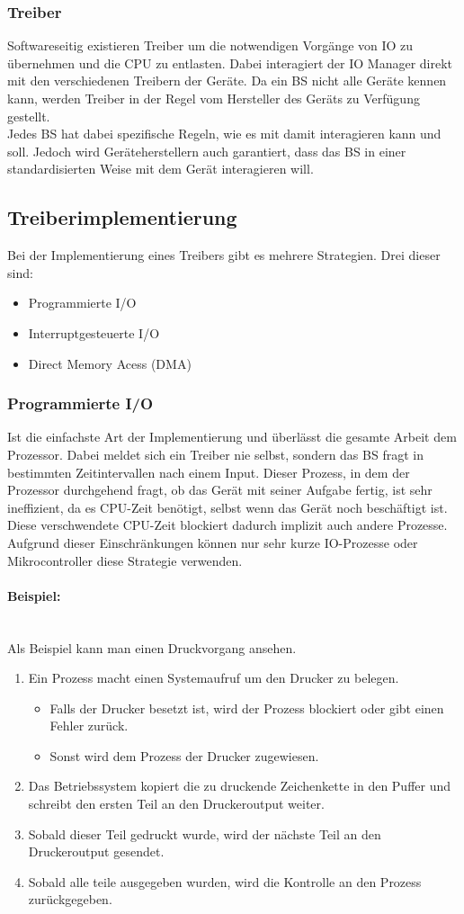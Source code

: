 \documentclass{article}
\newcommand{\paragraphlb}[1]{\paragraph{#1}\mbox{}\\}
\begin{document}
	\subsubsection{Treiber}
	Softwareseitig existieren Treiber um die notwendigen Vorgänge von IO zu übernehmen und die CPU zu entlasten. Dabei interagiert der IO Manager direkt mit den verschiedenen Treibern der Geräte. Da ein BS nicht alle Geräte kennen kann, werden Treiber in der Regel vom Hersteller des Geräts zu Verfügung gestellt. \\
	Jedes BS hat dabei spezifische Regeln, wie es mit damit interagieren kann und soll. Jedoch wird Geräteherstellern auch garantiert, dass das BS in einer standardisierten Weise mit dem Gerät interagieren will.
	\subsection{Treiberimplementierung}
	Bei der Implementierung eines Treibers gibt es mehrere Strategien. Drei dieser sind:
	\begin{itemize}
		\item{Programmierte I/O}
		\item{Interruptgesteuerte I/O}
		\item{Direct Memory Acess (DMA)}
	\end{itemize}
	\subsubsection{Programmierte I/O}
	Ist die einfachste Art der Implementierung und überlässt die gesamte Arbeit dem Prozessor. Dabei meldet sich ein Treiber nie selbst, sondern das BS fragt in bestimmten Zeitintervallen nach einem Input. Dieser Prozess, in dem der Prozessor durchgehend fragt, ob das Gerät mit seiner Aufgabe fertig, ist sehr ineffizient, da es CPU-Zeit benötigt, selbst wenn das Gerät noch beschäftigt ist. Diese verschwendete CPU-Zeit blockiert dadurch implizit auch andere Prozesse. Aufgrund dieser Einschränkungen können nur sehr kurze IO-Prozesse oder Mikrocontroller diese Strategie verwenden.
	\paragraphlb{Beispiel:}
	Als Beispiel kann man einen Druckvorgang ansehen.
	\begin{enumerate}
		\item{Ein Prozess macht einen Systemaufruf um den Drucker zu belegen.}
		\begin{itemize}
			\item{Falls der Drucker besetzt ist, wird der Prozess blockiert oder gibt einen Fehler zurück.}
			\item{Sonst wird dem Prozess der Drucker zugewiesen.}
		\end{itemize}
		\item{Das Betriebssystem kopiert die zu druckende Zeichenkette in den Puffer und schreibt den ersten Teil an den Druckeroutput weiter.}
		\item{Sobald dieser Teil gedruckt wurde, wird der nächste Teil an den Druckeroutput gesendet.}
		\item{Sobald alle teile ausgegeben wurden, wird die Kontrolle an den Prozess zurückgegeben.}
	\end{enumerate}
\end{document}
